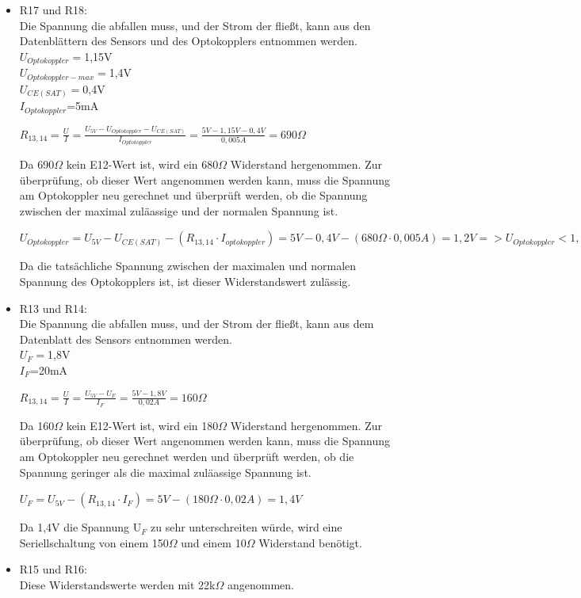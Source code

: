 \begin{itemize}
\item R17 und R18: \\
Die Spannung die abfallen muss, und der Strom der fließt, kann aus den Datenblättern des Sensors und des Optokopplers entnommen werden.\\
$U_{Optokoppler}=$1,15V \\
$U_{Optokoppler-max}=$1,4V \\
$U_{CE(SAT)}=$0,4V \\
$I_{Optokoppler}$=5mA \\

\begin{center}
$R_{13,14}=\frac{U}{I}=\frac{U_{5V}-U_{Optokoppler}-U_{CE(SAT)}}{I_{Optokoppler}}=\frac{5V-1,15V-0,4V}{0,005A}=690\Omega$
\end{center}
Da 690$\Omega$ kein E12-Wert ist, wird ein 680$\Omega$ Widerstand hergenommen.
Zur überprüfung, ob dieser Wert angenommen werden kann, muss die Spannung am Optokoppler neu gerechnet und überprüft werden, ob die Spannung  zwischen der maximal zuläassige und der normalen Spannung ist.
\begin{center}
$U_{Optokoppler}=U_{5V}-U_{CE(SAT)}-(R_{13,14} \cdot I_{optokoppler})=5V-0,4V-(680\Omega \cdot 0,005A) = 1,2V => U_{Optokoppler} < 1,2V < U_{Optokoppler-max}$
\end{center}
Da die tatsächliche Spannung zwischen der maximalen und normalen Spannung des Optokopplers ist, ist dieser Widerstandswert zulässig.\\
\item R13 und R14:\\
Die Spannung die abfallen muss, und der Strom der fließt, kann aus dem Datenblatt des Sensors entnommen werden.\\
$U_{F}=$1,8V \\
$I_{F}$=20mA \\

\begin{center}
$R_{13,14}=\frac{U}{I}=\frac{U_{5V}-U_{F}}{I_{F}}=\frac{5V-1,8V}{0,02A}=160\Omega$
\end{center}
Da 160$\Omega$ kein E12-Wert ist, wird ein 180$\Omega$ Widerstand hergenommen.
Zur überprüfung, ob dieser Wert angenommen werden kann, muss die Spannung am Optokoppler  neu gerechnet werden und überprüft werden, ob die Spannung geringer als die maximal zuläassige Spannung ist.
\begin{center}
$U_{F}=U_{5V}-(R_{13,14} \cdot I_{F})=5V-(180\Omega \cdot 0,02A) = 1,4V$
\end{center}
Da 1,4V die Spannung U$_{F}$ zu sehr unterschreiten würde, wird eine Seriellschaltung von einem 150$\Omega$ und einem 10$\Omega$ Widerstand benötigt.
\item R15 und R16:\\
Diese Widerstandswerte werden mit 22k$\Omega$ angenommen.
\end{itemize}


